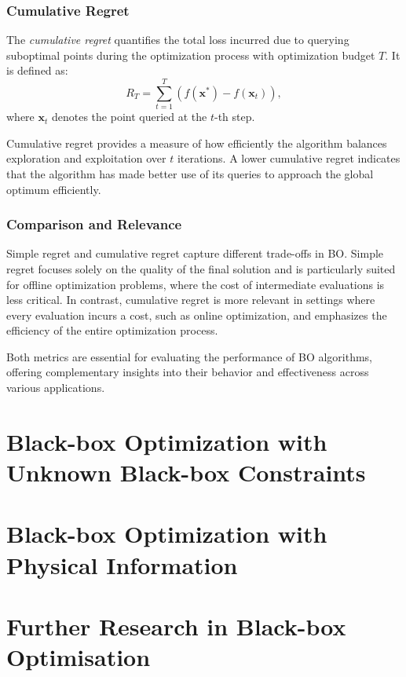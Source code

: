 \subsubsection{Cumulative Regret}

The \emph{cumulative regret} quantifies the total loss incurred due to querying suboptimal points during the optimization process with optimization budget $T$. It is defined as:
\[
R_T = \sum_{t=1}^T \left( f(\mathbf{x}^*) - f(\mathbf{x}_t) \right),
\]
where \( \mathbf{x}_t \) denotes the point queried at the \( t \)-th step. 

Cumulative regret provides a measure of how efficiently the algorithm balances exploration and exploitation over \( t \) iterations. A lower cumulative regret indicates that the algorithm has made better use of its queries to approach the global optimum efficiently.

\subsubsection{Comparison and Relevance}

Simple regret and cumulative regret capture different trade-offs in BO. Simple regret focuses solely on the quality of the final solution and is particularly suited for offline optimization problems, where the cost of intermediate evaluations is less critical. In contrast, cumulative regret is more relevant in settings where every evaluation incurs a cost, such as online optimization, and emphasizes the efficiency of the entire optimization process.

Both metrics are essential for evaluating the performance of BO algorithms, offering complementary insights into their behavior and effectiveness across various applications.

\section{Black-box Optimization with Unknown Black-box Constraints}
\label{section:bo_unknown_constraints}

\section{Black-box Optimization with Physical Information}
\label{section:bo_physics}

\section{Further Research in Black-box Optimisation}
\label{section:bo_further_research}


